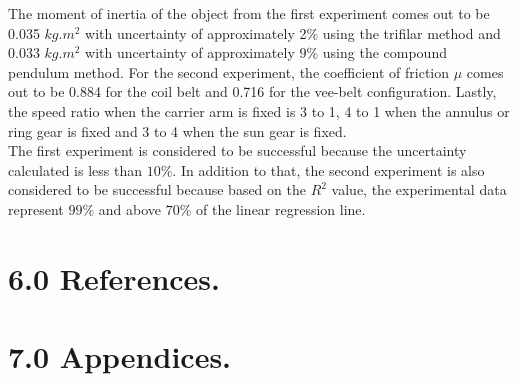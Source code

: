 \documentclass[12pt,a4paper]{report}
\begin{document}
The moment of inertia of the object from the first experiment comes out to be 0.035 $kg.m^2$ with uncertainty of approximately 2$\%$ using the trifilar method and 0.033 $kg.m^2$ with uncertainty of approximately $9\%$ using the compound pendulum method. For the second experiment, the coefficient of friction $\mu$ comes out to be 0.884 for the coil belt and 0.716 for the vee-belt configuration. Lastly, the speed ratio when the carrier arm is fixed is 3 to 1, 4 to 1 when the annulus or ring gear is fixed and 3 to 4 when the sun gear is fixed.\\

The first experiment is considered to be successful because the uncertainty calculated is less than $10\%$. In addition to that, the second experiment is also considered to be successful because based on the $R^2$ value, the experimental data represent $99\%$ and above $70\%$ of the linear regression line. 
\pagebreak
\section*{6.0 References.}

\appendix
\section*{7.0 Appendices.}
\end{document}
